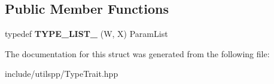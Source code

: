 \subsection*{Public Member Functions}
\begin{DoxyCompactItemize}
\item 
\hypertarget{structutilspp_1_1PointerOnFunction_3_01V_07_5_08_07W_00_01X_08_4_a0b1e8c99c12e4472d42983b13f1f4f4d}{typedef {\bfseries T\-Y\-P\-E\-\_\-\-L\-I\-S\-T\-\_} (W, X) Param\-List}\label{structutilspp_1_1PointerOnFunction_3_01V_07_5_08_07W_00_01X_08_4_a0b1e8c99c12e4472d42983b13f1f4f4d}

\end{DoxyCompactItemize}


The documentation for this struct was generated from the following file\-:\begin{DoxyCompactItemize}
\item 
include/utilspp/Type\-Trait.\-hpp\end{DoxyCompactItemize}
